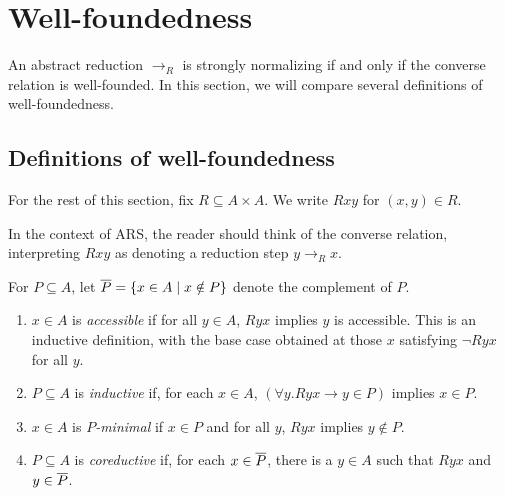 \section{Well-foundedness}

\newcommand{\then}{\Longrightarrow}
\label{sec:Well-foundedness}



An abstract reduction $\to_R$ is strongly normalizing
if and only if the converse relation is well-founded.
In this section, we will compare several definitions of well-foundedness.

\subsection{Definitions of well-foundedness}

For the rest of this section, fix $R \subseteq A \times A$.  We write $Rxy$ for $(x,y) \in R$.

In the context of ARS, the reader should think of the converse relation,
interpreting $Rxy$ as denoting a reduction step $y \to_R x$.

For $P \subseteq A$, let $\overline{P} = \{ x \in A \mid x \notin P\}$ denote the complement of $P$.
\begin{definition}\label{def:WFnotions} \hfill
   \begin{enumerate}
    \item $x \in A$ is \emph{accessible} if for all $y \in A$, $Ryx$ implies $y$ is accessible.
      This is an inductive definition, with the base case obtained at
     those $x$ satisfying $\lnot Ryx$ for all $y$.
    \item $P \subseteq A$ is \emph{inductive}
    if, for each $x \in A$, $(\forall y. Ryx \to y \in P)$ implies $x \in P$.


    \item $x \in A$ is \emph{$P$-minimal} if $x \in P$ and for all $y$,
    $Ryx$ implies $y \notin P$.

    \item $P \subseteq A$ is \emph{coreductive} if, for each $x \in \overline{P}$, there is a $y \in A$ such that $Ryx$ and $y \in \overline{P}$.

  \end{enumerate}
\end{definition}

